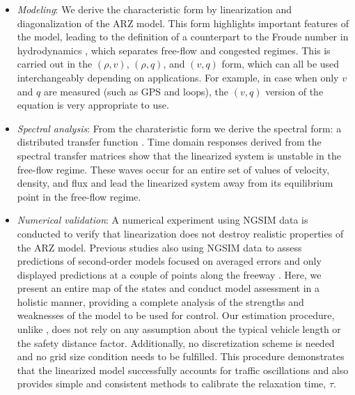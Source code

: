 \documentclass[preprint]{elsarticle}
\begin{document}
\begin{itemize}
\item \textit{Modeling}: We derive the characteristic form by linearization and diagonalization of the ARZ model. This form highlights important features of the model, leading to the definition of a counterpart to the Froude number in hydrodynamics \cite{litrico2009modeling}, which separates free-flow and congested regimes. This is carried out in the $\left(\rho, v \right)$, $\left(\rho, q\right)$, and $\left(v, q\right)$ form, which can all be used interchangeably depending on applications. For example, in case when only $v$ and $q$ are measured (such as GPS and loops), the $\left(v, q\right)$ version of the equation is very appropriate to use.

\item \textit{Spectral analysis}: From the charateristic form we derive the spectral form: a distributed transfer function \cite{litrico2009modeling}. Time domain responses derived from the spectral transfer matrices show that the linearized system is unstable in the free-flow regime. These waves occur for an entire set of values of velocity, density, and flux and lead the linearized system away from its equilibrium point in the free-flow regime. 

\item \textit{Numerical validation}: A numerical experiment using NGSIM data is conducted to verify that linearization does not destroy realistic properties of the ARZ model. Previous studies also using NGSIM data to assess predictions of second-order models focused on averaged errors and only displayed predictions at a couple of points along the freeway \cite{GodunovARZ,Fan}. Here, we present an entire map of the states and conduct model assessment in a holistic manner, providing a complete analysis of the strengths and weaknesses of the model to be used for control. Our estimation procedure, unlike \cite{Fan}, does not rely on any assumption about the typical vehicle length or the safety distance factor. Additionally, no discretization scheme is needed and no grid size condition needs to be fulfilled. This procedure demonstrates that the linearized model successfully accounts for traffic oscillations and also provides simple and consistent methods to calibrate the relaxation time, $\tau$.
\end{itemize}
\end{document}
